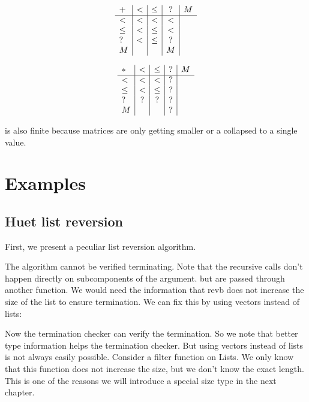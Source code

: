 \begin{definition}
\[
\begin{array}{l | c |c | c | c}

 +    &  <   &  \leq   &  ? & M \\
 \hline 
 <    &  <   & <       &  < &  \\
 \leq &  <   & \leq    &  < &  \\
 ?    &  <   & \leq    &  ? &  \\
 M    &      &         &  M &  
\end{array}
\]

\end{definition}


\begin{definition}
\[
\begin{array}{l | c |c | c| c }
 *    &  <  &  \leq &   ? & M \\
\hline
  <   & <    & <    &   ? &   \\
 \leq & <    & \leq &   ? &   \\
 ?    & ?    & ?    &   ? &   \\
 M    &      &      &   ? &
\end{array}
\]
\end{definition}

\begin{definition}
is also finite because matrices are only getting smaller or a collapsed to a single value.
\end{definition}

\section{Examples}


\subsection{Huet list reversion}
First, we present a peculiar list reversion algorithm.

The algorithm cannot be verified terminating.
Note that the recursive calls don't happen directly on subcomponents of the argument.
but are passed through another function.
We would need the information that revb does not increase the size of the list to ensure termination.
We can fix this by using vectors instead of lists:

Now the termination checker can verify the termination.
So we note that better type information helps the termination checker.
But using vectors instead of lists is not always easily possible.
Consider a filter function on Lists. We only know that this function does not increase the size, but
we don't know the exact length.
This is one of the reasons we will introduce a special size type in the next chapter.

